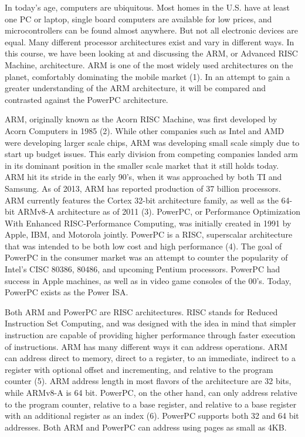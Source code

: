 \documentclass[letterpaper,10pt,onecolumn,titlepage]{article}
\begin{document}


\par
In today's age, computers are ubiquitous. Most homes in the U.S. have at least one PC or
laptop, single board computers are available for low prices, and microcontrollers can be
found almost anywhere. But not all electronic devices are equal. Many different processor
architectures exist and vary in different ways. In this course, we have been looking at
and discussing the ARM, or Advanced RISC Machine, architecture. ARM is one of the most
widely used architectures on the planet, comfortably dominating the mobile market (1). In
an attempt to gain a greater understanding of the ARM architecture, it will be compared
and contrasted against the PowerPC architecture.

\par
ARM, originally known as the Acorn RISC Machine, was first developed by Acorn Computers 
in 1985 (2). While other companies such as Intel and AMD were developing larger scale
chips, ARM was developing small scale simply due to start up budget issues. This early
division from competing companies landed arm in its dominant position in the smaller scale
market that it still holds today. ARM hit its stride in the early 90's, when it was
approached by both TI and Samsung. As of 2013, ARM has reported production of 37 billion
processors. ARM currently features the Cortex 32-bit architecture family, as well as
the 64-bit ARMv8-A architecture as of 2011 (3). PowerPC, or Performance Optimization With
Enhanced RISC-Performance Computing, was initially created in 1991 by Apple, IBM, and
Motorola jointly. PowerPC is a RISC, superscalar architecture that was intended to be both
low cost and high performance (4). The goal of PowerPC in the consumer market was an
attempt to counter the popularity of Intel's CISC 80386, 80486, and upcoming Pentium
processors. PowerPC had success in Apple machines, as well as in video game consoles of
the 00's. Today, PowerPC exists as the Power ISA.

\par
Both ARM and PowerPC are RISC architectures. RISC stands for Reduced Instruction Set
Computing, and was designed with the idea in mind that simpler instruction are capable
of providing higher performance through faster execution of instructions. ARM has many
different ways it can address operations. ARM can address direct to memory, direct to a
register, to an immediate, indirect to a register with optional offset and incrementing,
and relative to the program counter (5). ARM address length in most flavors of the
architecture are 32 bits, while ARMv8-A is 64 bit. PowerPC, on the other hand, can only address
relative to the program counter, relative to a base register, and relative to a base
register with an additional register as an index (6). PowerPC supports both 32 and 64 bit
addresses. Both ARM and PowerPC can address using pages as small as 4KB.
\end{document}
